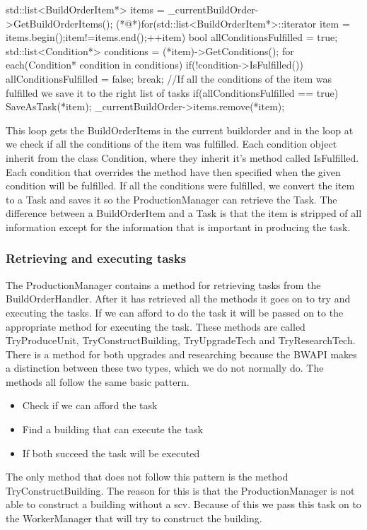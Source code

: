 				\begin{Sourcecode}[caption=BuildOrderHandler main loop]
		std::list<BuildOrderItem*> items = _currentBuildOrder->GetBuildOrderItems();
		(*@\lnote@*)for(std::list<BuildOrderItem*>::iterator item = items.begin();item!=items.end();++item)
		{
			bool allConditionsFulfilled = true;
			std::list<Condition*> conditions = (*item)->GetConditions();
			for each(Condition* condition in conditions)
			{
				if(!condition->IsFulfilled())
				{
					allConditionsFulfilled = false;
					break;
				}
			}
			//If all the conditions of the item was fulfilled we save it to the right list of tasks
			if(allConditionsFulfilled == true)
			{
				SaveAsTask(*item);				
				_currentBuildOrder->items.remove(*item);
			}
		}	
				\end{Sourcecode}
			This loop gets the BuildOrderItems in the current buildorder and in the loop at  we check if all the conditions of the item was 
			fulfilled. Each condition object inherit from the class Condition, where they inherit it's method called IsFulfilled. Each condition that 
			overrides the method have then specified when the given condition will be fulfilled. If all the conditions were fulfilled, we convert the 
			item to a Task and saves it so the ProductionManager can retrieve the Task. The difference between a BuildOrderItem and a Task is that the 
			item is stripped of all information except for the information that is important in producing the task. 
			
		\subsubsection*{Retrieving and executing tasks}
			The ProductionManager contains a method for retrieving tasks from the BuildOrderHandler. After it has retrieved all the methods it goes on to 
			try and executing the tasks. If we can afford to do the task it will be passed on to the appropriate method for executing the task. These 
			methods are called TryProduceUnit, TryConstructBuilding, TryUpgradeTech and TryResearchTech. There is a method for both upgrades and 
			researching because the BWAPI makes a distinction between these two types, which we do not normally do. The methods all follow the same basic 
			pattern.
			\begin{itemize}
				\item Check if we can afford the task
				\item Find a building that can execute the task
				\item If both succeed the task will be executed
			\end{itemize}
			The only method that does not follow this pattern is the method TryConstructBuilding. The reason for this is that the ProductionManager is not 
			able to construct a building without a scv. Because of this we pass this task on to the WorkerManager that will try to construct the building.
			
